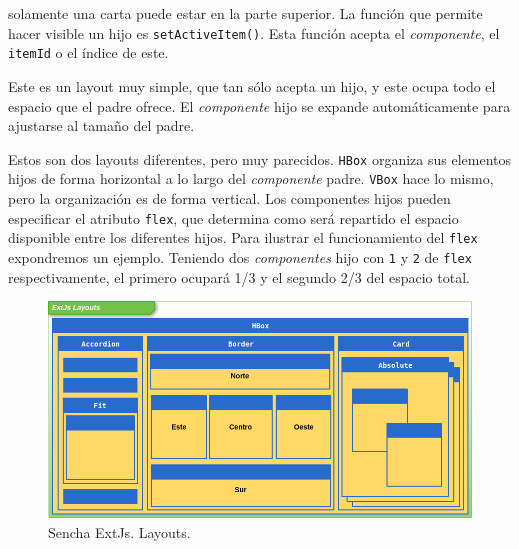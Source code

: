 \begin{description}[style=unboxed,leftmargin=0cm,labelwidth=1cm]
			  solamente una carta puede estar en la parte superior. La función que permite hacer visible un hijo es \texttt{setActiveItem()}.
			  Esta función acepta el \emph{componente}, el \texttt{itemId} o el índice de este.
			\item[\texttt{Fit}] Este es un layout muy simple, que tan sólo acepta un hijo, y este ocupa todo el espacio que el padre ofrece.
			  El \emph{componente} hijo se expande automáticamente para ajustarse al tamaño del padre.
			\item[\texttt{HBox y VBox}] Estos son dos layouts diferentes, pero muy parecidos. \texttt{HBox} organiza sus elementos hijos
			  de forma horizontal a lo largo del \emph{componente} padre. \texttt{VBox} hace lo mismo, pero la organización es de forma
			  vertical. Los componentes hijos pueden especificar el atributo \texttt{flex}, que determina como será repartido el
			  espacio disponible entre los diferentes hijos. Para ilustrar el funcionamiento del \texttt{flex} expondremos un ejemplo.
			  Teniendo dos \emph{componentes} hijo con \texttt{1} y \texttt{2} de \texttt{flex} respectivamente, el primero ocupará 1/3 y
			  el segundo 2/3 del espacio total.
		\end{description}
		\begin{figure}[h]
			\centering
			\includegraphics[keepaspectratio, width=1\textwidth]{./img/layouts.png}
			\caption{Sencha ExtJs. Layouts.}   
			\label{fig:layouts}
		\end{figure}

